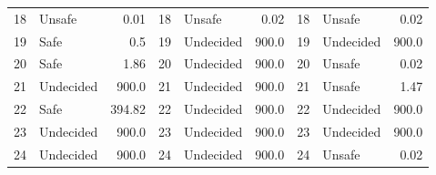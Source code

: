 \begin{table}[!ht]
\begin{tabular}{|llr|llr|llr|}
    18 & Unsafe & 0.01 &    18 & Unsafe & 0.02 &    18 & Unsafe & 0.02\\ 
    19 & Safe & 0.5 &    19 & Undecided & 900.0 &    19 & Undecided & 900.0\\ 
    20 & Safe & 1.86 &    20 & Undecided & 900.0 &    20 & Unsafe & 0.02\\ 
    21 & Undecided & 900.0 &    21 & Undecided & 900.0 &    21 & Unsafe & 1.47\\ 
    22 & Safe & 394.82 &    22 & Undecided & 900.0 &    22 & Undecided & 900.0\\ 
    23 & Undecided & 900.0 &    23 & Undecided & 900.0 &    23 & Undecided & 900.0\\ 
    24 & Undecided & 900.0 &    24 & Undecided & 900.0 &    24 & Unsafe & 0.02\\ 
    \bottomrule
  \end{tabular}
\end{table}

